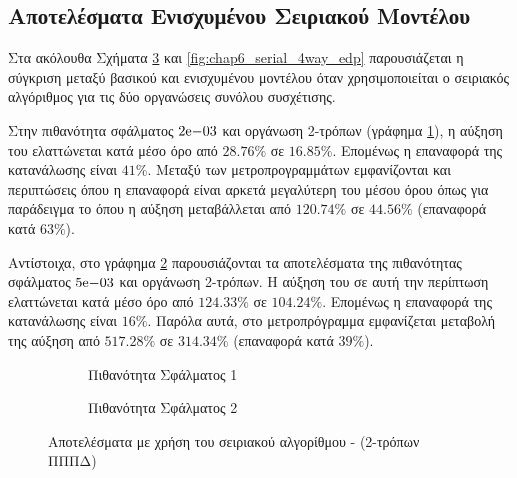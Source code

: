 
\subsection{Αποτελέσματα Ενισχυμένου Σειριακού Μοντέλου}
\label{chap6_mcpatSerialAlgResults}

Στα ακόλουθα Σχήματα \ref{fig:chap6_serial_2way_edp} και \ref{fig:chap6_serial_4way_edp} παρουσιάζεται η σύγκριση μεταξύ βασικού και ενισχυμένου μοντέλου όταν χρησιμοποιείται ο σειριακός αλγόριθμος για τις δύο οργανώσεις συνόλου συσχέτισης.
\par
Στην πιθανότητα σφάλματος $2\mathrm{e}{-03}$ και οργάνωση 2-τρόπων (γράφημα \ref{fig:chap6_serial_2way_pail1_edp}), η αύξηση του \edp ελαττώνεται κατά μέσο όρο από $28.76\%$ σε $16.85\%$. Επομένως η επαναφορά της κατανάλωσης είναι $41\%$. Μεταξύ των μετροπρογραμμάτων εμφανίζονται και περιπτώσεις όπου η επαναφορά είναι αρκετά μεγαλύτερη του μέσου όρου όπως για παράδειγμα το  όπου η αύξηση μεταβάλλεται από $120.74\%$ σε $44.56\%$ (επαναφορά κατά $63\%$).
\par
Αντίστοιχα, στο γράφημα \ref{fig:chap6_serial_2way_pail2_edp} παρουσιάζονται τα αποτελέσματα της πιθανότητας σφάλματος $5\mathrm{e}{-03}$ και οργάνωση 2-τρόπων. Η αύξηση του \edp σε αυτή την περίπτωση ελαττώνεται κατά μέσο όρο από $124.33\%$ σε $104.24\%$. Επομένως η επαναφορά της κατανάλωσης είναι $16\%$. Παρόλα αυτά, στο μετροπρόγραμμα  εμφανίζεται μεταβολή της αύξηση από $517.28\%$ σε $314.34\%$ (επαναφορά κατά $39\%$).

\begin{figure}[!t]
    \centering
    \begin{subfigure}[t]{\textwidth}
        \centering
        \caption{Πιθανότητα Σφάλματος 1}
        \label{fig:chap6_serial_2way_pail1_edp}
    \end{subfigure}
    
    \begin{subfigure}[t]{\textwidth}
        \centering
        \caption{Πιθανότητα Σφάλματος 2}
        \label{fig:chap6_serial_2way_pail2_edp}
    \end{subfigure}
    
    \caption{Αποτελέσματα με χρήση του σειριακού αλγορίθμου - (2-τρόπων ΠΠΠΔ)}
    \label{fig:chap6_serial_2way_edp}
\end{figure}

